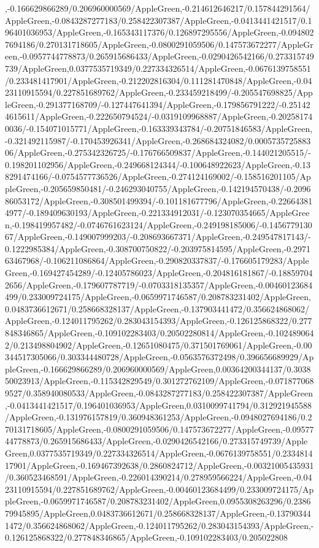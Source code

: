 {\begin{tikzternal}
{,-0.166629866289/0.206960000569/AppleGreen,-0.214612646217/0.157844291564/AppleGreen,-0.0843287277183/0.258422307387/AppleGreen,-0.0413441421517/0.196401036953/AppleGreen,-0.165343117376/0.126897295556/AppleGreen,-0.0948027694186/0.270131718605/AppleGreen,-0.0800291059506/0.147573672277/AppleGreen,-0.0957744778873/0.265915686433/AppleGreen,-0.0290426542166/0.273315749739/AppleGreen,0.0377535719349/0.227334326514/AppleGreen,-0.0676139758551/0.233481417901/AppleGreen,-0.212202816304/0.111281470848/AppleGreen,-0.0423110915594/0.227851689762/AppleGreen,-0.233459218499/-0.205547698825/AppleGreen,-0.291377168709/-0.127447641394/AppleGreen,-0.179856791222/-0.251424615611/AppleGreen,-0.222650794524/-0.0319109968887/AppleGreen,-0.202581740036/-0.154071015771/AppleGreen,-0.163339343784/-0.20751846583/AppleGreen,-0.321492115987/-0.170453926341/AppleGreen,-0.268684324082/0.000573572588306/AppleGreen,-0.275342326725/-0.176766509837/AppleGreen,-0.144021205515/-0.198201102956/AppleGreen,-0.249668124344/-0.100648922623/AppleGreen,-0.138291474166/-0.0754577736526/AppleGreen,-0.274124169002/-0.158516201105/AppleGreen,-0.205659850481/-0.246293040755/AppleGreen,-0.142194570438/-0.209686053172/AppleGreen,-0.308501499394/-0.101181677796/AppleGreen,-0.226643814977/-0.189409630193/AppleGreen,-0.221334912031/-0.123070354665/AppleGreen,-0.198419957482/-0.0746761623124/AppleGreen,-0.249198185006/-0.145677913067/AppleGreen,-0.149007999203/-0.208693667371/AppleGreen,-0.249547817143/-0.1222985384/AppleGreen,-0.308700750822/-0.203975814595/AppleGreen,-0.297163467968/-0.106211086864/AppleGreen,-0.290820337837/-0.176605179283/AppleGreen,-0.169427454289/-0.12405786023/AppleGreen,-0.204816181867/-0.188597042656/AppleGreen,-0.179607787719/-0.0703318135357/AppleGreen,-0.00460123684499/0.233009724175/AppleGreen,-0.0659971746587/0.208783231402/AppleGreen,0.0483736612671/0.258668328137/AppleGreen,-0.137903441472/0.356624868062/AppleGreen,-0.124011795262/0.283043154393/AppleGreen,-0.126125868322/0.277848346865/AppleGreen,-0.109102283403/0.20502280814/AppleGreen,-0.1024890642/0.213498804902/AppleGreen,-0.12651080475/0.371501769061/AppleGreen,-0.00344517305066/0.303344480728/AppleGreen,-0.0563576372498/0.396656689929/AppleGreen,-0.166629866289/0.206960000569/AppleGreen,0.00364200344137/0.303850023913/AppleGreen,-0.115342829549/0.301272762109/AppleGreen,-0.0718770689527/0.358940080533/AppleGreen,-0.0843287277183/0.258422307387/AppleGreen,-0.0413441421517/0.196401036953/AppleGreen,0.0310099741794/0.312921945588/AppleGreen,-0.131976157819/0.360948361253/AppleGreen,-0.0948027694186/0.270131718605/AppleGreen,-0.0800291059506/0.147573672277/AppleGreen,-0.0957744778873/0.265915686433/AppleGreen,-0.0290426542166/0.273315749739/AppleGreen,0.0377535719349/0.227334326514/AppleGreen,-0.0676139758551/0.233481417901/AppleGreen,-0.169467392638/0.2860824712/AppleGreen,-0.00321005435931/0.360523468591/AppleGreen,-0.226014390214/0.278959566224/AppleGreen,-0.0423110915594/0.227851689762/AppleGreen,-0.00460123684499/0.233009724175/AppleGreen,-0.0659971746587/0.208783231402/AppleGreen,0.0955308263296/0.238679945895/AppleGreen,0.0483736612671/0.258668328137/AppleGreen,-0.137903441472/0.356624868062/AppleGreen,-0.124011795262/0.283043154393/AppleGreen,-0.126125868322/0.277848346865/AppleGreen,-0.109102283403/0.205022808}
\end{tikzternal}}
